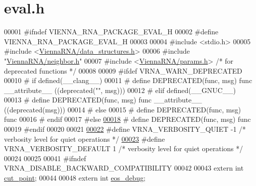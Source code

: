\hypertarget{eval_8h_source}{}\section{eval.\+h}
\label{eval_8h_source}

\begin{DoxyCode}
00001 \textcolor{preprocessor}{#ifndef VIENNA\_RNA\_PACKAGE\_EVAL\_H}
00002 \textcolor{preprocessor}{#define VIENNA\_RNA\_PACKAGE\_EVAL\_H}
00003 
00004 \textcolor{preprocessor}{#include <stdio.h>}
00005 \textcolor{preprocessor}{#include <\mbox{\hyperlink{data__structures_8h}{ViennaRNA/data\_structures.h}}>}
00006 \textcolor{preprocessor}{#include "\mbox{\hyperlink{neighbor_8h}{ViennaRNA/neighbor.h}}"}
00007 \textcolor{preprocessor}{#include <\mbox{\hyperlink{params_8h}{ViennaRNA/params.h}}>}   \textcolor{comment}{/* for deprecated functions */}
00008 
00009 \textcolor{preprocessor}{#ifdef VRNA\_WARN\_DEPRECATED}
00010 \textcolor{preprocessor}{# if defined(\_\_clang\_\_)}
00011 \textcolor{preprocessor}{#  define DEPRECATED(func, msg) func \_\_attribute\_\_ ((deprecated("", msg)))}
00012 \textcolor{preprocessor}{# elif defined(\_\_GNUC\_\_)}
00013 \textcolor{preprocessor}{#  define DEPRECATED(func, msg) func \_\_attribute\_\_ ((deprecated(msg)))}
00014 \textcolor{preprocessor}{# else}
00015 \textcolor{preprocessor}{#  define DEPRECATED(func, msg) func}
00016 \textcolor{preprocessor}{# endif}
00017 \textcolor{preprocessor}{#else}
\mbox{\hyperlink{eval_8h_aab347a3c03fbe8e7319551b9fa0cce4a}{00018}} \textcolor{preprocessor}{# define DEPRECATED(func, msg) func}
00019 \textcolor{preprocessor}{#endif}
00020 
00021 
\mbox{\hyperlink{eval_8h_af4afe19780b61b4962c613bde324128b}{00022}} \textcolor{preprocessor}{#define VRNA\_VERBOSITY\_QUIET     -1     }\textcolor{comment}{/* verbosity level for quiet operations */}\textcolor{preprocessor}{}
\mbox{\hyperlink{eval_8h_a47430d9e875084cfb983b22612e3abdf}{00023}} \textcolor{preprocessor}{#define VRNA\_VERBOSITY\_DEFAULT    1     }\textcolor{comment}{/* verbosity level for quiet operations */}\textcolor{preprocessor}{}
00024 
00025 
00041 \textcolor{preprocessor}{#ifndef VRNA\_DISABLE\_BACKWARD\_COMPATIBILITY}
00042 
00043 \textcolor{keyword}{extern} \textcolor{keywordtype}{int}  \mbox{\hyperlink{group__eval_gab9b2c3a37a5516614c06d0ab54b97cda}{cut\_point}};
00044 
00048 \textcolor{keyword}{extern} \textcolor{keywordtype}{int}  \mbox{\hyperlink{group__eval_ga567530678f6260a1a649a5beca5da4c5}{eos\_debug}};

\end{DoxyCode}
